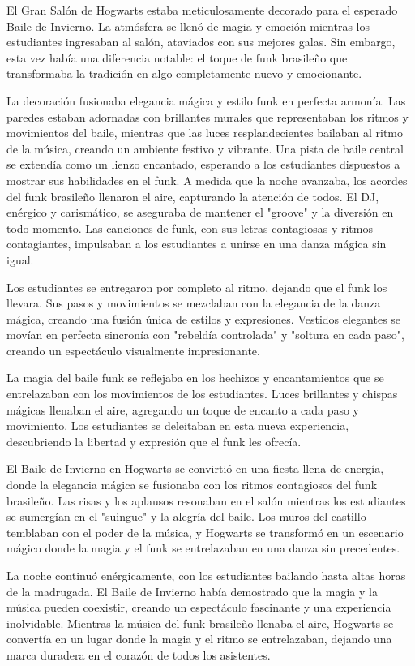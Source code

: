 El Gran Salón de Hogwarts estaba meticulosamente decorado para el esperado Baile de Invierno. La atmósfera se llenó de magia y emoción mientras los estudiantes ingresaban al salón, ataviados con sus mejores galas. Sin embargo, esta vez había una diferencia notable: el toque de funk brasileño que transformaba la tradición en algo completamente nuevo y emocionante.

La decoración fusionaba elegancia mágica y estilo funk en perfecta armonía. Las paredes estaban adornadas con brillantes murales que representaban los ritmos y movimientos del baile, mientras que las luces resplandecientes bailaban al ritmo de la música, creando un ambiente festivo y vibrante. Una pista de baile central se extendía como un lienzo encantado, esperando a los estudiantes dispuestos a mostrar sus habilidades en el funk.
A medida que la noche avanzaba, los acordes del funk brasileño llenaron el aire, capturando la atención de todos. El DJ, enérgico y carismático, se aseguraba de mantener el "groove" y la diversión en todo momento. Las canciones de funk, con sus letras contagiosas y ritmos contagiantes, impulsaban a los estudiantes a unirse en una danza mágica sin igual.

Los estudiantes se entregaron por completo al ritmo, dejando que el funk los llevara. Sus pasos y movimientos se mezclaban con la elegancia de la danza mágica, creando una fusión única de estilos y expresiones. Vestidos elegantes se movían en perfecta sincronía con "rebeldía controlada" y "soltura en cada paso", creando un espectáculo visualmente impresionante.

La magia del baile funk se reflejaba en los hechizos y encantamientos que se entrelazaban con los movimientos de los estudiantes. Luces brillantes y chispas mágicas llenaban el aire, agregando un toque de encanto a cada paso y movimiento. Los estudiantes se deleitaban en esta nueva experiencia, descubriendo la libertad y expresión que el funk les ofrecía.

El Baile de Invierno en Hogwarts se convirtió en una fiesta llena de energía, donde la elegancia mágica se fusionaba con los ritmos contagiosos del funk brasileño. Las risas y los aplausos resonaban en el salón mientras los estudiantes se sumergían en el "suingue" y la alegría del baile. Los muros del castillo temblaban con el poder de la música, y Hogwarts se transformó en un escenario mágico donde la magia y el funk se entrelazaban en una danza sin precedentes.

La noche continuó enérgicamente, con los estudiantes bailando hasta altas horas de la madrugada. El Baile de Invierno había demostrado que la magia y la música pueden coexistir, creando un espectáculo fascinante y una experiencia inolvidable. Mientras la música del funk brasileño llenaba el aire, Hogwarts se convertía en un lugar donde la magia y el ritmo se entrelazaban, dejando una marca duradera en el corazón de todos los asistentes.
